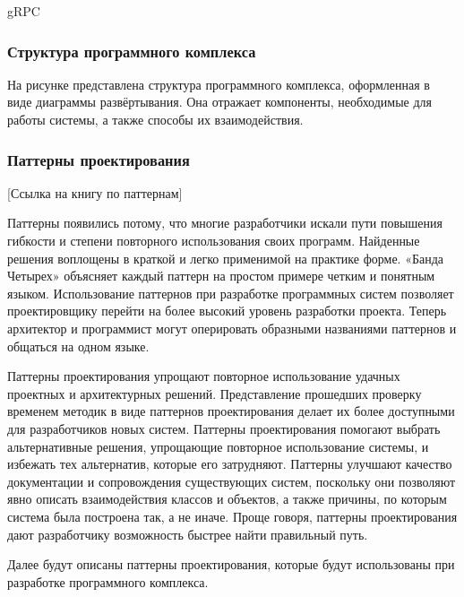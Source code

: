 


gRPC



\subsubsection{Структура программного комплекса}

На рисунке представлена структура программного комплекса, оформленная в виде диаграммы развёртывания. Она отражает компоненты, необходимые для работы системы, а также способы их взаимодействия. 



\subsubsection{Паттерны проектирования}

[Ссылка на книгу по паттернам]

Паттерны появились потому, что многие разработчики искали пути повышения гибкости и степени повторного использования своих программ.
Найденные решения воплощены в краткой и легко применимой на практике
форме. «Банда Четырех» объясняет каждый паттерн на простом примере
четким и понятным языком. Использование паттернов при разработке
программных систем позволяет проектировщику перейти на более высокий уровень разработки проекта. Теперь архитектор и программист могут
оперировать образными названиями паттернов и общаться на одном языке.

Паттерны проектирования упрощают повторное использование удачных
проектных и архитектурных решений. Представление прошедших проверку
временем методик в виде паттернов проектирования делает их более доступными для разработчиков новых систем. Паттерны проектирования помогают
выбрать альтернативные решения, упрощающие повторное использование
системы, и избежать тех альтернатив, которые его затрудняют. Паттерны
улучшают качество документации и сопровождения существующих систем, поскольку они позволяют явно описать взаимодействия классов и объектов,
а также причины, по которым система была построена так, а не иначе. Проще
говоря, паттерны проектирования дают разработчику возможность быстрее
найти правильный путь.

Далее будут описаны паттерны проектирования, которые будут использованы при разработке программного комплекса.

